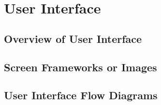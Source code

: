 \section{User Interface}
\label{sec:userinterface}

\subsection{Overview of User Interface}
\label{sec:overviewui}

\subsection{Screen Frameworks or Images}
\label{sec:frameworks}

\subsection{User Interface Flow Diagrams}
\label{sec:flowdiagrams}

